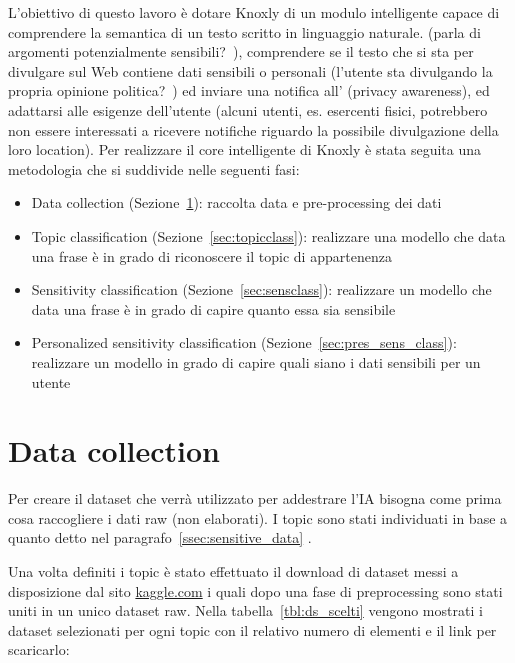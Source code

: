 L'obiettivo di questo lavoro è dotare Knoxly di un modulo intelligente capace di comprendere la semantica di un testo scritto in linguaggio naturale. (parla di argomenti potenzialmente sensibili?~\cite{dataspectrum}), comprendere se il testo che si sta per divulgare sul Web contiene dati sensibili o personali (l'utente sta divulgando la propria opinione politica?~\cite{}) ed inviare una notifica all' (privacy awareness), ed adattarsi alle esigenze dell'utente (alcuni utenti, es. esercenti fisici, potrebbero non essere interessati a ricevere notifiche riguardo la possibile divulgazione della loro location).
Per realizzare il core intelligente di Knoxly è stata seguita una metodologia che si suddivide nelle seguenti fasi:
\begin{itemize}
    \item Data collection (Sezione~\ref{datacollection}): raccolta data e pre-processing dei dati
    \item Topic classification (Sezione~\ref{sec:topicclass}): realizzare una modello che data una frase è in grado di riconoscere il topic di appartenenza
    \item Sensitivity classification (Sezione~\ref{sec:sensclass}): realizzare un modello che data una frase è in grado di capire quanto essa sia sensibile
    \item Personalized sensitivity classification (Sezione~\ref{sec:pres_sens_class}): realizzare un modello in grado di capire quali siano i dati sensibili per un utente
\end{itemize}

\section{Data collection}
\label{datacollection}
Per creare il dataset che verrà utilizzato per addestrare l'IA bisogna come prima cosa raccogliere i dati raw (non elaborati).
I topic sono stati individuati in base a quanto detto nel paragrafo~\ref{ssec:sensitive_data} .


Una volta definiti i topic è stato effettuato il download di dataset messi a disposizione dal sito \href{https://www.kaggle.com/}{kaggle.com} i quali dopo una fase di preprocessing sono stati uniti in un unico dataset raw. Nella tabella~\ref{tbl:ds_scelti} vengono mostrati i dataset selezionati per ogni topic con il relativo numero di elementi e il link per scaricarlo:


